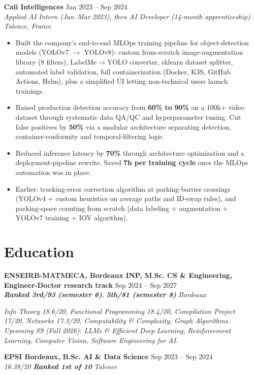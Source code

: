 \documentclass[10pt, letterpaper]{article}
\newcommand{\entry}[4]{
  \noindent \textbf{#1} \hfill #2 \\
  \textit{#3} \hfill \textit{#4} \par
}
\begin{document}
\entry{Cali Intelligences}{Jan 2023 -- Sep 2024}{Applied AI Intern (Jan--Mar 2023), then AI Developer (14-month apprenticeship)}{Talence, France}
\begin{itemize}
    \item Built the company's end-to-end MLOps training pipeline for object-detection models (YOLOv7 $\to$ YOLOv8): custom from-scratch image-augmentation library (8 filters), LabelMe$\to$YOLO converter, sklearn dataset splitter, automated label validation, full containerization (Docker, K3S, GitHub Actions, Helm), plus a simplified UI letting non-technical users launch trainings.
    \item Raised production detection accuracy from \textbf{60\% to 90\%} on a 100k+ video dataset through systematic data QA/QC and hyperparameter tuning. Cut false positives by \textbf{50\%} via a modular architecture separating detection, container-conformity and temporal-filtering logic.
    \item Reduced inference latency by \textbf{70\%} through architecture optimization and a deployment-pipeline rewrite. Saved \textbf{7h per training cycle} once the MLOps automation was in place.
    \item Earlier: tracking-error correction algorithm at parking-barrier crossings (YOLOv4 + custom heuristics on average paths and ID-swap rules), and parking-space counting from scratch (data labeling + augmentation + YOLOv7 training + IOV algorithm).
\end{itemize}

\section{Education}

\entry{ENSEIRB-MATMECA, Bordeaux INP, M.Sc. CS \& Engineering, Engineer-Doctor research track}{Sep 2024 -- Sep 2027}{\textbf{Ranked 3rd/93 (semester 6)}, \textbf{5th/81 (semester 8)}}{Bordeaux}

\hspace{1em}\textit{Info Theory 18.6/20, Functional Programming 18.4/20, Compilation Project 17/20, Networks 17.3/20, Computability \& Complexity, Graph Algorithms. Upcoming S9 (Fall 2026): LLMs \& Efficient Deep Learning, Reinforcement Learning, Computer Vision, Software Engineering for AI.}

\vspace{2pt}

\entry{EPSI Bordeaux, B.Sc. AI \& Data Science}{Sep 2023 -- Sep 2024}{16.38/20 \quad \textbf{Ranked 1st of 10}}{Talence}
\end{document}

